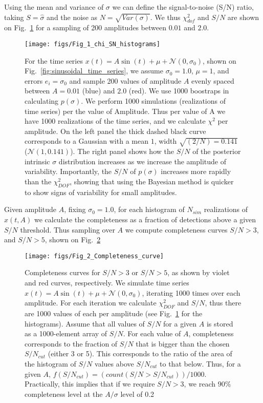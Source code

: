 \documentclass[fleqn,usenatbib]{mnras}  %
\begin{document}
Using the mean and variance of $\sigma$ we can define the signal-to-noise (S/N) ratio, taking  $S= \hat{\sigma}$ and the noise as $N = \sqrt{Var(\sigma)}$. We thus $\chi^{2}_{dof}$ and $S/N$ are shown on Fig.~\ref{fig:chi2_and_SN} for a sampling of 200 amplitudes between $0.01$ and $2.0$.  

\begin{figure}
 \texttt{[image: figs/Fig\_1\_chi\_SN\_histograms]}
 \caption{For the time series $x(t) = A \sin{(t)}+\mu+\mathcal{N}(0,\sigma_{0})$, shown on Fig.~\ref{fig:sinusoidal_time_series}, we assume $\sigma_{0}=1.0$, $\mu=1$, and errors $e_{i} = \sigma_{0}$ and sample 200 values of amplitude $A$ evenly spaced between $A=0.01$ (blue) and $2.0$ (red). We use 1000 boostraps in calculating $p(\sigma)$. We perform  1000 simulations (realizations of time series) per the value of Amplitude. Thus per value of A we have 1000 realizations of the time series, and we calculate $\chi^{2}$ per amplitude.  On the left panel the thick dashed black curve corresponds to a Gaussian  with a mean $1$, width $\sqrt{(2/N) = 0.141}$  ($\mathcal{N}(1,0.141)$). The right panel shows how the $S/N$ of the posterior intrinsic $\sigma$ distribution increases as we increase the amplitude of variability. Importantly, the  $S/N$ of $p(\sigma)$ increases more rapidly than the $\chi^{2}_{DOF}$, showing that using the Bayesian method is quicker to show signs of variability for small amplitudes.}
 \label{fig:chi2_and_SN}
\end{figure}

Given amplitude $A$, fixing $\sigma_{0} =1.0$,  for each histogram of $N_{sim}$ realizations of $x(t,A)$   we calculate the completeness as a  fraction of detections above a given $S/N$ threshold. Thus sampling over $A$ we compute completeness curves $S/N > 3$, and $S/N > 5$, shown on Fig.~\ref{fig:completeness_curve}


\begin{figure}
  \texttt{[image: figs/Fig\_2\_Completeness\_curve]}
  \caption{Completeness curves for $S/N > 3$ or $S/N > 5$, as shown by violet and red curves, respectively. We simulate time series $x(t) = A \sin{(t)}+\mu+\mathcal{N}(0,\sigma_{0})$, iterating 1000 times over each amplitude. For each iteration we calculate $\chi^{2}_{DOF}$ and $S/N$, thus there are 1000 values of each per amplitude (see Fig.~\ref{fig:chi2_and_SN}  for the histograms).  Assume that all values of $S/N$ for a given $A$ is stored as a 1000-element array of $S/N$. For each value of $A$, completeness corresponds to the fraction of $S/N$ that is bigger than the chosen  $S/N_{cut}$ (either 3 or 5). This corresponds to the ratio of the area of the histogram of $S/N$ values  above  $S/N_{cut}$  to that below. Thus, for a given $A$,  $f(S/N_{cut}) = (count(S/N > S/N_{cut})) / 1000$. Practically, this implies that if we require $S/N > 3$, we reach $90\%$ completeness level at the $A/\sigma$ level of 0.2}
  \label{fig:completeness_curve}
\end{figure}
\end{document}
